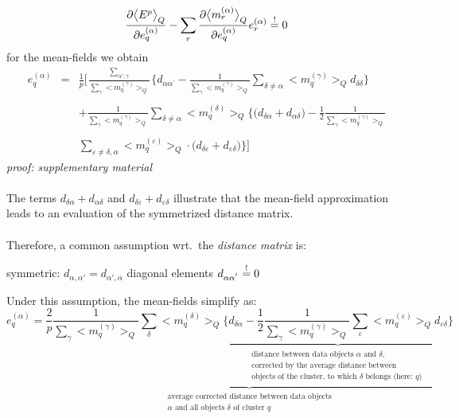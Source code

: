 \begin{equation}
	\frac{\partial \big< E^p \big>_Q}{\partial e_q^{(\alpha)}}
	- \sum\limits_r \frac{\partial \big< m_r^{(\alpha)} \big>_Q}{
		\partial e_q^{(\alpha)}}
		e_r^{(\alpha)} \stackrel{\mathrm{!}}{=} 0
\end{equation}
for the mean-fields we obtain
\begin{equation}
	\begin{array}{lll}
	e_q^{(\alpha)}
	& = & \frac{1}{p} \Bigg[ \frac{\sum_{\alpha',\gamma}}{\sum\limits_{\gamma} \big<
		m_q^{(\gamma)} \big>_Q} \bigg\{ d_{\alpha \alpha^{'}}
		-\frac{1}{\sum\limits_{\gamma} \big< m_q^{(\gamma)} \big>_Q}
		\sum\limits_{\delta \neq \alpha} \big< m_q^{(\gamma)} \big>_Q
		d_{\delta\delta} \bigg\} \\\\
	&& + \frac{1}{\sum\limits_{\gamma}
		\big< m_q^{(\gamma)} \big>_Q } \sum\limits_{\delta \neq \alpha}
		\big< m_q^{(\delta)} \big>_Q \bigg\{ \big( d_{\delta \alpha}
		+ d_{\alpha \delta} \big) - \frac{1}{2} \frac{1}{
		\sum\limits_{\gamma} \big< m_q^{(\gamma)} \big>_Q} \\\\
	&& \sum\limits_{\varepsilon \neq \delta, \alpha} 
		\big< m_q^{(\varepsilon)} \big>_Q \cdot \big( d_{\delta 
		\varepsilon} + d_{\varepsilon \delta} \big) \bigg\} \Bigg]
	\end{array}
\end{equation}
{\it proof: supplementary material}
\\\\
The terms $ d_{\delta \alpha} + d_{\alpha \delta}$ and $d_{\delta
  \varepsilon} + d_{\varepsilon \delta}$ illustrate that the
mean-field approximation leads to an evaluation of the symmetrized
distance matrix. 
\\\\
Therefore, a common assumption wrt.\ the \emph{distance matrix} is:
\begin{itemize}
	\itl symmetric: $d_{\alpha,\alpha'}=d_{\alpha',\alpha}$
	\itl diagonal elements $d_{\alpha \alpha^{'}} \stackrel{\mathrm{!}}{=} 0$
\end{itemize}
Under this assumption, the mean-fields simplify as:
\begin{equation}\label{eq:simplifiedMeanFields}
	e_q^{(\alpha)} = \underbrace{
	\frac{2}{p} \frac{1}{\sum\limits_{\gamma} \big< m_q^{(\gamma)} \big>_Q}
	\sum\limits_{\delta} \big< m_q^{(\delta)} \big>_Q 
	\underbrace{ \Bigg\{ d_{\delta \alpha} - \frac{1}{2} \frac{1}{
		\sum\limits_{\gamma} \big< m_q^{(\gamma)} \big>_Q} 
		\sum\limits_{\varepsilon} \big< m_q^{(\varepsilon)} \big>_Q
		d_{\varepsilon \delta} \Bigg\} }_{
		\substack{	\text{distance between data objects } \alpha
				\text{ and } \delta, \\
				\text{corrected by the average distance between}
				\\
				\text{objects of the cluster, to which } \delta
				\text{ belongs (here: } q \text{) } }}
	}_{ \substack{	\text{average corrected distance between data objects}\\
			\alpha \text{ and all objects } \delta \text{ of cluster } q}}
\end{equation}
